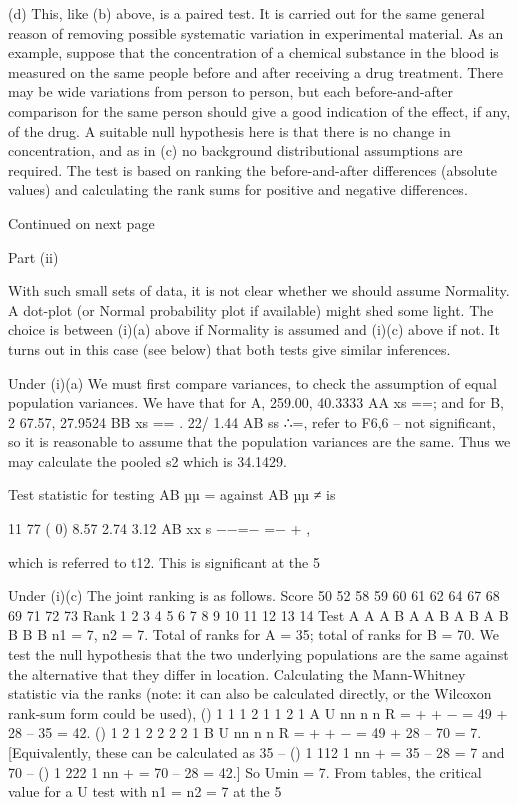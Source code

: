 \documentclass[a4paper,12pt]{article}
\begin{document}
(d) This, like (b) above, is a paired test.  It is carried out for the same general reason of removing possible systematic variation in experimental material. 
 As an example, suppose that the concentration of a chemical substance in the blood is measured on the same people before and after receiving a drug treatment.  There may be wide variations from person to person, but each before-and-after comparison for the same person should give a good indication of the effect, if any, of the drug.  A suitable null hypothesis here is that there is no change in concentration, and as in (c) no background distributional assumptions are required.  The test is based on ranking the before-and-after differences (absolute values) and calculating the rank sums for positive and negative differences. 
 
 
Continued on next page 

 
 
Part (ii) 
 
With such small sets of data, it is not clear whether we should assume Normality.  A dot-plot (or Normal probability plot if available) might shed some light.  The choice is between (i)(a) above if Normality is assumed and (i)(c) above if not.  It turns out in this case (see below) that both tests give similar inferences. 
 
Under (i)(a) 
 We must first compare variances, to check the assumption of equal population variances.  We have that for A, 259.00, 40.3333 AA xs ==;  and for B, 2 67.57, 27.9524 BB xs == .  22/ 1.44 AB ss ∴=,  refer to F6,6  –  not significant, so it is reasonable to assume that the population variances are the same. 
 Thus we may calculate the pooled s2 which is 34.1429. 
 
Test statistic for testing AB µµ = against AB µµ ≠ is 
 
11 77 ( 0) 8.57 2.74 3.12 AB xx s −−=− =− +
, 
 
which is referred to t12.  This is significant at the 5%
 
Under (i)(c) 
 The joint ranking is as follows. 
 Score 50 52 58 59 60 61 62 64 67 68 69 71 72 73 Rank 1 2 3 4 5 6 7 8 9 10 11 12 13 14 Test A A A B A A B A B A B B B B 
 n1 = 7, n2 = 7.    Total of ranks for A = 35;  total of ranks for B = 70. 
 We test the null hypothesis that the two underlying populations are the same against the alternative that they differ in location. 
 Calculating the Mann-Whitney statistic via the ranks (note:  it can also be calculated directly, or the Wilcoxon rank-sum form could be used), 
  () 1 1 1 2 1 1 2 1 A U nn n n R = + + − = 49 + 28 – 35 = 42.   () 1 2 1 2 2 2 2 1 B U nn n n R = + + − = 49 + 28 – 70 = 7. 
 [Equivalently, these can be calculated as 35 – () 1 112 1 nn + = 35 – 28 = 7 and 70 – () 1 222 1 nn + = 70 – 28 = 42.] 
 So Umin = 7.  From tables, the critical value for a U test with n1 = n2 = 7 at the 5%
\end{document}
